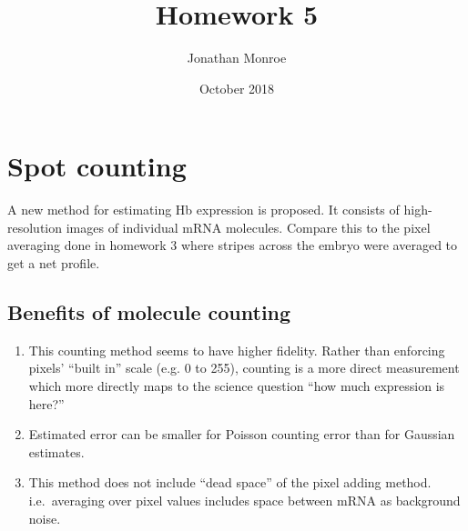 \documentclass{article}
\title{Homework 5}
\author{Jonathan Monroe }
\date{October 2018}
\begin{document}
\maketitle

\section{Spot counting}

    A new method for estimating Hb expression is proposed. It consists of high-resolution images of individual mRNA molecules. Compare this to the pixel averaging done in homework 3 where stripes across the embryo were averaged to get a net profile.

    \subsection{Benefits of molecule counting}
    \begin{enumerate}
        \item This counting method seems to have higher fidelity. Rather than enforcing pixels' ``built in'' scale (e.g. 0 to 255), counting is a more direct measurement which more directly maps to the science question ``how much expression is here?''
        \item Estimated error can be smaller for Poisson counting error than for Gaussian estimates.
        \item This method does not include ``dead space'' of the pixel adding method. i.e.\ averaging over pixel values includes space between mRNA as background noise.
    \end{enumerate}
    
\end{document}
